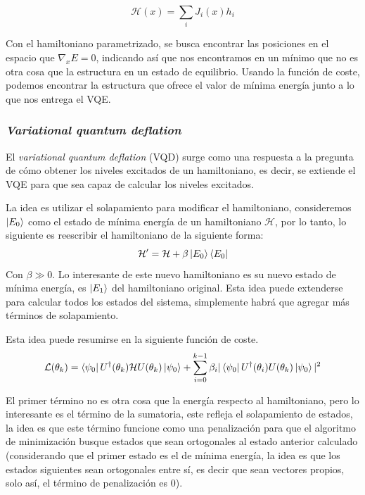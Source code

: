 \begin{equation*}
    \mathcal{H}(x) = \sum_i J_i(x)h_i
\end{equation*}

Con el hamiltoniano parametrizado, se busca encontrar las posiciones en el espacio que $\nabla_x E=0$, indicando así que nos encontramos en un mínimo que no es otra cosa que la estructura en un estado de equilibrio. Usando la función de coste, podemos encontrar la estructura que ofrece el valor de mínima energía junto a lo que nos entrega el VQE.



\subsubsection{\textit{Variational quantum deflation}}
El \textit{variational quantum deflation} (VQD) \cite{Higgott2019variationalquantum} surge como una respuesta a la pregunta de cómo obtener los niveles excitados de un hamiltoniano, es decir, se extiende el VQE para que sea capaz de calcular los niveles excitados.

La idea es utilizar el solapamiento para modificar el hamiltoniano, consideremos $\ket{E_0}$ como el estado de mínima energía de un hamiltoniano $\mathcal{H}$, por lo tanto, lo siguiente es reescribir el hamiltoniano de la siguiente forma:
\begin{equation*}
    \mathcal{H}^{\prime} = \mathcal{H} + \beta\ket{E_0}\bra{E_0}
\end{equation*}
Con $\beta \gg 0$. Lo interesante de este nuevo hamiltoniano es su nuevo estado de mínima energía, es $\ket{E_1}$ del hamiltoniano original. Esta idea puede extenderse para calcular todos los estados del sistema, simplemente habrá que agregar más términos de solapamiento.


Esta idea puede resumirse en la siguiente función de coste.
\begin{equation*}
    \mathcal{L}(\theta_k) = \bra{\psi_0}U^{\dag}(\theta_k)\mathcal{H}U(\theta_k)\ket{\psi_0} + \sum_{i=0}^{k-1}\beta_i |\bra{\psi_0}U^{\dag}(\theta_i)U(\theta_k)\ket{\psi_0} |^{2}
\end{equation*}

El primer término no es otra cosa que la energía respecto al hamiltoniano, pero lo interesante es el término de la sumatoria, este refleja el solapamiento de estados, la idea es que este término funcione como una penalización para que el algoritmo de minimización busque estados que sean ortogonales al estado anterior calculado (considerando que el primer estado es el de mínima energía, la idea es que los estados siguientes sean ortogonales entre sí, es decir que sean vectores propios, solo así, el término de penalización es 0).




